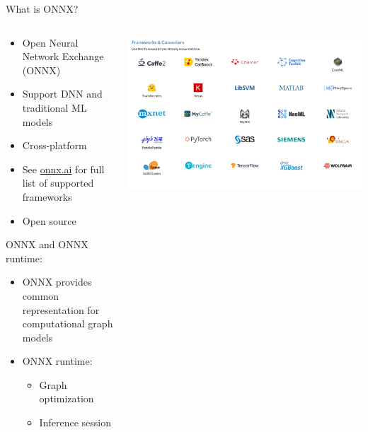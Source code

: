 \documentclass[aspectratio=169,9pt]{beamer}
\begin{document}
\begin{frame}[t]{What is ONNX?}
  \begin{columns}
    \begin{column}{0.5\textwidth}
      \begin{itemize}
        \item Open Neural Network Exchange (ONNX)
        \item Support DNN and traditional ML models
        \item Cross-platform
        \item See \href{https://onnx.ai/supported-tools.html}{\color{blue} onnx.ai} for full list of supported frameworks
        \item Open source
      \end{itemize}
      \vspace*{1cm}
      ONNX and ONNX runtime:
      \begin{itemize}
        \item ONNX provides common representation for computational graph models
        \item ONNX runtime:
        \begin{itemize}
          \item Graph optimization
          \item Inference session
        \end{itemize}
      \end{itemize}
    \end{column}
    \begin{column}{0.5\textwidth}
      \includegraphics[width=.9\textwidth]{frameworks_converters.png}
    \end{column}
  \end{columns}
\end{frame}
\end{document}
